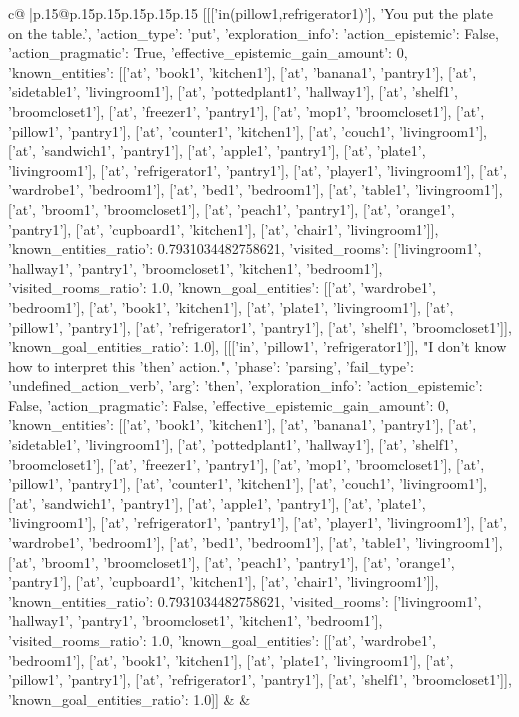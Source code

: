 \documentclass{article}
\begin{document}
{\begin{supertabular}{c@{$\;$}|p{.15\linewidth}@{}p{.15\linewidth}p{.15\linewidth}p{.15\linewidth}p{.15\linewidth}p{.15\linewidth}}
{{{	 [[['in(pillow1,refrigerator1)'], 'You put the plate on the table.', {'action_type': 'put', 'exploration_info': {'action_epistemic': False, 'action_pragmatic': True, 'effective_epistemic_gain_amount': 0, 'known_entities': [['at', 'book1', 'kitchen1'], ['at', 'banana1', 'pantry1'], ['at', 'sidetable1', 'livingroom1'], ['at', 'pottedplant1', 'hallway1'], ['at', 'shelf1', 'broomcloset1'], ['at', 'freezer1', 'pantry1'], ['at', 'mop1', 'broomcloset1'], ['at', 'pillow1', 'pantry1'], ['at', 'counter1', 'kitchen1'], ['at', 'couch1', 'livingroom1'], ['at', 'sandwich1', 'pantry1'], ['at', 'apple1', 'pantry1'], ['at', 'plate1', 'livingroom1'], ['at', 'refrigerator1', 'pantry1'], ['at', 'player1', 'livingroom1'], ['at', 'wardrobe1', 'bedroom1'], ['at', 'bed1', 'bedroom1'], ['at', 'table1', 'livingroom1'], ['at', 'broom1', 'broomcloset1'], ['at', 'peach1', 'pantry1'], ['at', 'orange1', 'pantry1'], ['at', 'cupboard1', 'kitchen1'], ['at', 'chair1', 'livingroom1']], 'known_entities_ratio': 0.7931034482758621, 'visited_rooms': ['livingroom1', 'hallway1', 'pantry1', 'broomcloset1', 'kitchen1', 'bedroom1'], 'visited_rooms_ratio': 1.0, 'known_goal_entities': [['at', 'wardrobe1', 'bedroom1'], ['at', 'book1', 'kitchen1'], ['at', 'plate1', 'livingroom1'], ['at', 'pillow1', 'pantry1'], ['at', 'refrigerator1', 'pantry1'], ['at', 'shelf1', 'broomcloset1']], 'known_goal_entities_ratio': 1.0}}], [[['in', 'pillow1', 'refrigerator1']], "I don't know how to interpret this 'then' action.", {'phase': 'parsing', 'fail_type': 'undefined_action_verb', 'arg': 'then', 'exploration_info': {'action_epistemic': False, 'action_pragmatic': False, 'effective_epistemic_gain_amount': 0, 'known_entities': [['at', 'book1', 'kitchen1'], ['at', 'banana1', 'pantry1'], ['at', 'sidetable1', 'livingroom1'], ['at', 'pottedplant1', 'hallway1'], ['at', 'shelf1', 'broomcloset1'], ['at', 'freezer1', 'pantry1'], ['at', 'mop1', 'broomcloset1'], ['at', 'pillow1', 'pantry1'], ['at', 'counter1', 'kitchen1'], ['at', 'couch1', 'livingroom1'], ['at', 'sandwich1', 'pantry1'], ['at', 'apple1', 'pantry1'], ['at', 'plate1', 'livingroom1'], ['at', 'refrigerator1', 'pantry1'], ['at', 'player1', 'livingroom1'], ['at', 'wardrobe1', 'bedroom1'], ['at', 'bed1', 'bedroom1'], ['at', 'table1', 'livingroom1'], ['at', 'broom1', 'broomcloset1'], ['at', 'peach1', 'pantry1'], ['at', 'orange1', 'pantry1'], ['at', 'cupboard1', 'kitchen1'], ['at', 'chair1', 'livingroom1']], 'known_entities_ratio': 0.7931034482758621, 'visited_rooms': ['livingroom1', 'hallway1', 'pantry1', 'broomcloset1', 'kitchen1', 'bedroom1'], 'visited_rooms_ratio': 1.0, 'known_goal_entities': [['at', 'wardrobe1', 'bedroom1'], ['at', 'book1', 'kitchen1'], ['at', 'plate1', 'livingroom1'], ['at', 'pillow1', 'pantry1'], ['at', 'refrigerator1', 'pantry1'], ['at', 'shelf1', 'broomcloset1']], 'known_goal_entities_ratio': 1.0}}]] 
	  } 
	   } 
	   } 
	 & & \\ 
 


\end{supertabular}}
\end{document}
